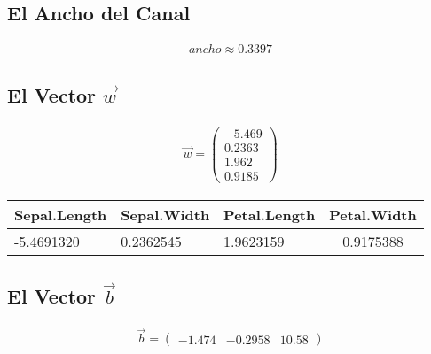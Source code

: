 \documentclass[fleqn]{llncs}
\begin{document}
\subsection{El Ancho del Canal}
\begin{align*}
	ancho \approx 0.3397
\end{align*}

\subsection{El Vector $\overrightarrow{w}$}
\begin{align*}
	\overrightarrow{w} =
	\begin{pmatrix}
		-5.469 \\
		0.2363 \\
		1.962 \\
		0.9185
	\end{pmatrix}
\end{align*}
\begin{tabular}{l l l c}
	Sepal.Length & Sepal.Width & Petal.Length & Petal.Width \\
	\hline
	-5.4691320 & 0.2362545 & 1.9623159 & 0.9175388 \\
\end{tabular}

\subsection{El Vector $\overrightarrow{b}$}
\begin{align*}
	\overrightarrow{b} =
	\begin{pmatrix}
		-1.474 & -0.2958 & 10.58
	\end{pmatrix}
\end{align*}
\end{document}
